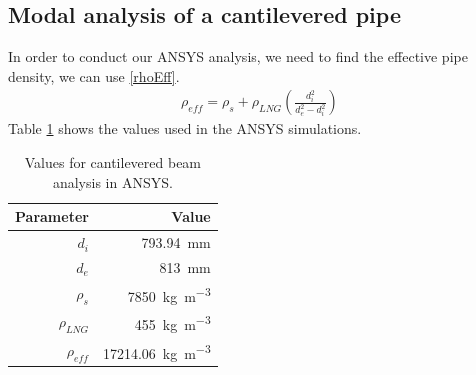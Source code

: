 \subsection{Modal analysis of a cantilevered pipe}
In order to conduct our ANSYS analysis, we need to find the effective pipe density, we can use \eqref{rhoEff}.
\begin{gather}\label{rhoEff}
    \rho_{eff} = \rho_s + \rho_{LNG}\left(\frac{d_i^2}{d_e^2 - d_i^2}\right)
\end{gather}
Table \ref{modalParams} shows the values used in the ANSYS simulations. 
\begin{table}[H]
    \centering
    \begin{tabular}{@{}rr@{}}
        \toprule
        \textbf{Parameter} & \textbf{Value}\\
        \midrule
        $d_i$ & \SI{793.94}{\milli\meter}\\
        $d_e$ & \SI{813}{\milli\meter}\\
        $\rho_s$ & \SI{7850}{\kilo\gram\per\meter\cubed}\\
        $\rho_{LNG}$ & \SI{455}{\kilo\gram\per\meter\cubed}\\
        $\rho_{eff}$ & \SI{17214.06}{\kilo\gram\per\meter\cubed}\\
        \bottomrule
    \end{tabular}
    \caption{Values for cantilevered beam analysis in ANSYS.}
    \label{modalParams}
\end{table}
